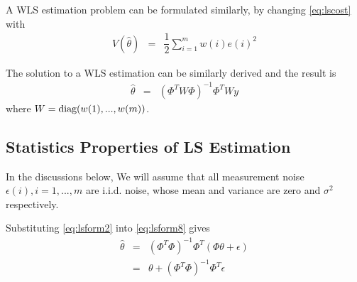 A WLS estimation problem can be formulated similarly, by changing \eqref{eq:lscost} with
\begin{eqnarray}
  V(\hat{\theta}) &=& \dfrac{1}{2}\sum_{i=1}^{m}w(i)e(i)^2 \nonumber
\end{eqnarray}

The solution to a WLS estimation can be similarly derived and the result is
\begin{eqnarray}
  \hat{\theta} &=& \left(\Phi^TW\Phi\right)^{-1}\Phi^TWy \nonumber
\end{eqnarray}
where $W = \textup{diag}(w(1), ...,w(m))$.

\subsection{Statistics Properties of LS Estimation}

In the discussions below, We will assume that all measurement noise $\epsilon(i), i=1,...,m$ are i.i.d. noise, whose mean and variance are zero and $\sigma^2$ respectively.

Substituting \eqref{eq:lsform2} into \eqref{eq:lsform8} gives
\begin{eqnarray}
  \hat{\theta} &=& \left(\Phi^T\Phi\right)^{-1}\Phi^T\left(\Phi\theta + \epsilon\right) \nonumber \\
  &=& \theta + \left(\Phi^T\Phi\right)^{-1}\Phi^T\epsilon \label{eq:lsform9}
\end{eqnarray}

